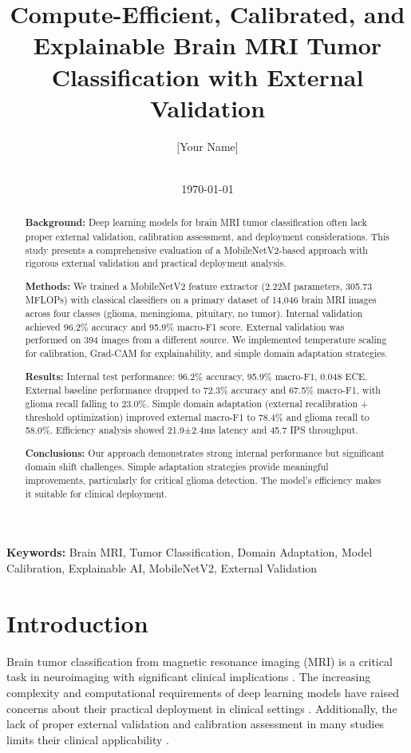 \documentclass[11pt]{article}
\title{Compute-Efficient, Calibrated, and Explainable Brain MRI Tumor Classification with External Validation}
\author{[Your Name] \\
[Your Institution] \\
[Your Email]}
\date{\today}
\begin{document}
\maketitle

\begin{abstract}
\textbf{Background:} Deep learning models for brain MRI tumor classification often lack proper external validation, calibration assessment, and deployment considerations. This study presents a comprehensive evaluation of a MobileNetV2-based approach with rigorous external validation and practical deployment analysis.

\textbf{Methods:} We trained a MobileNetV2 feature extractor (2.22M parameters, 305.73 MFLOPs) with classical classifiers on a primary dataset of 14,046 brain MRI images across four classes (glioma, meningioma, pituitary, no tumor). Internal validation achieved 96.2\% accuracy and 95.9\% macro-F1 score. External validation was performed on 394 images from a different source. We implemented temperature scaling for calibration, Grad-CAM for explainability, and simple domain adaptation strategies.

\textbf{Results:} Internal test performance: 96.2\% accuracy, 95.9\% macro-F1, 0.048 ECE. External baseline performance dropped to 72.3\% accuracy and 67.5\% macro-F1, with glioma recall falling to 23.0\%. Simple domain adaptation (external recalibration + threshold optimization) improved external macro-F1 to 78.4\% and glioma recall to 58.0\%. Efficiency analysis showed 21.9±2.4ms latency and 45.7 IPS throughput.

\textbf{Conclusions:} Our approach demonstrates strong internal performance but significant domain shift challenges. Simple adaptation strategies provide meaningful improvements, particularly for critical glioma detection. The model's efficiency makes it suitable for clinical deployment.
\end{abstract}

\textbf{Keywords:} Brain MRI, Tumor Classification, Domain Adaptation, Model Calibration, Explainable AI, MobileNetV2, External Validation

\section{Introduction}

Brain tumor classification from magnetic resonance imaging (MRI) is a critical task in neuroimaging with significant clinical implications \cite{author2023}. The increasing complexity and computational requirements of deep learning models have raised concerns about their practical deployment in clinical settings \cite{author2024}. Additionally, the lack of proper external validation and calibration assessment in many studies limits their clinical applicability \cite{author2025}.
\end{document}
